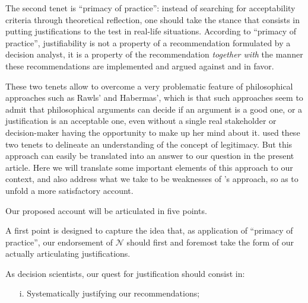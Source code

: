 \documentclass[preprint, french, english, 11pt, authoryear]{elsarticle}%
\newcommand{\adv}{\mathscr{N}}
\begin{document}
The second tenet is ``primacy of practice'': instead of searching for acceptability criteria through theoretical reflection, one should take the stance that consists in putting justifications to the test in real-life situations. According to ``primacy of practice'', justifiability is not a property of a recommendation formulated by a decision analyst, it is a property of the recommendation \emph{together with} the manner these recommendations are  implemented and argued against and in favor.

These two tenets allow to overcome a very problematic feature of philosophical approaches such as Rawls' and Habermas', which is that such approaches seem to admit that philosophical arguments can decide if an argument is a good one, or a justification is an acceptable one, even without a single real stakeholder or decision-maker having the opportunity to make up her mind about it.\cite{meinard_what_2017} used these two tenets to delineate an understanding of the concept of legitimacy. But this approach can easily be translated into an answer to our question in the present article. Here we will translate some important elements of this approach to our context, and also address what we take to be weaknesses of \cite{meinard_what_2017}'s approach, so as to unfold a more satisfactory account.

Our proposed account will be articulated in five points.

A first point is designed to capture the idea that, as application of ``primacy of practice'', our endorsement of $\adv$ should first and foremost take the form of our actually articulating justifications.

As decision scientists, our quest for justification should consist in:
\begin{itemize}
\item[i.]	Systematically justifying our recommendations;
\end{itemize}
\end{document}
